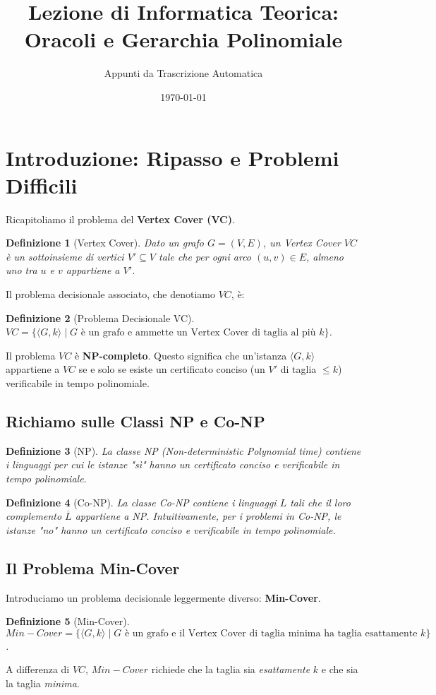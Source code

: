 \documentclass[a4paper]{article}
\title{Lezione di Informatica Teorica: Oracoli e Gerarchia Polinomiale}
\author{Appunti da Trascrizione Automatica}
\date{\today}
\newtheorem{definition}{Definizione}
\begin{document}
\maketitle
\tableofcontents
\newpage

\section{Introduzione: Ripasso e Problemi Difficili}

Ricapitoliamo il problema del \textbf{Vertex Cover (VC)}.
\begin{definition}[Vertex Cover]
Dato un grafo $G=(V,E)$, un Vertex Cover $VC$ è un sottoinsieme di vertici $V' \subseteq V$ tale che per ogni arco $(u,v) \in E$, almeno uno tra $u$ e $v$ appartiene a $V'$.
\end{definition}

Il problema decisionale associato, che denotiamo $VC$, è:
\begin{definition}[Problema Decisionale VC]
$VC = \{ \langle G, k \rangle \mid G \text{ è un grafo e ammette un Vertex Cover di taglia al più } k \}$.
\end{definition}
Il problema $VC$ è \textbf{NP-completo}. Questo significa che un'istanza $\langle G,k \rangle$ appartiene a $VC$ se e solo se esiste un certificato conciso (un $V'$ di taglia $\le k$) verificabile in tempo polinomiale.

\subsection{Richiamo sulle Classi NP e Co-NP}
\begin{definition}[NP]
La classe NP (Non-deterministic Polynomial time) contiene i linguaggi per cui le istanze "sì" hanno un certificato conciso e verificabile in tempo polinomiale.
\end{definition}
\begin{definition}[Co-NP]
La classe Co-NP contiene i linguaggi $L$ tali che il loro complemento $\overline{L}$ appartiene a NP. Intuitivamente, per i problemi in Co-NP, le istanze "no" hanno un certificato conciso e verificabile in tempo polinomiale.
\end{definition}

\subsection{Il Problema Min-Cover}
Introduciamo un problema decisionale leggermente diverso: \textbf{Min-Cover}.
\begin{definition}[Min-Cover]
$Min-Cover = \{ \langle G, k \rangle \mid G \text{ è un grafo e il Vertex Cover di taglia minima ha taglia esattamente } k \}$.
\end{definition}
A differenza di $VC$, $Min-Cover$ richiede che la taglia sia \emph{esattamente} $k$ e che sia la taglia \emph{minima}.
\end{document}
